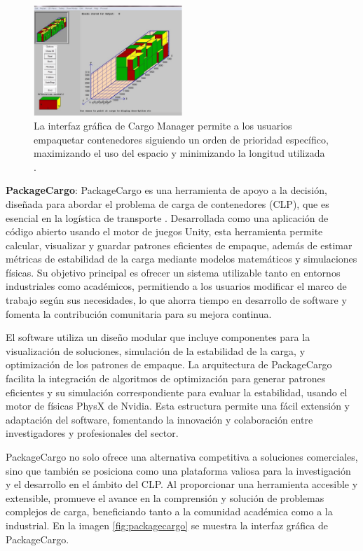 \documentclass[openany]{article}
\begin{document}
\begin{figure}[H]
    \centering
    \includegraphics[width=0.5\textwidth]{Figures/cargomanager.png}
    \caption{La interfaz gráfica de Cargo Manager permite a los usuarios empaquetar contenedores siguiendo un orden de prioridad específico, maximizando el uso del espacio y minimizando la longitud utilizada \parencite{zhao2017three}.}
    \label{fig:cargomanager}
\end{figure}

\textbf{PackageCargo}: PackageCargo es una herramienta de apoyo a la decisión, diseñada para abordar el problema de carga de contenedores (CLP), que es esencial en la logística de transporte \parencite{MARTINEZFRANCO2020100601}. Desarrollada como una aplicación de código abierto usando el motor de juegos Unity, esta herramienta permite calcular, visualizar y guardar patrones eficientes de empaque, además de estimar métricas de estabilidad de la carga mediante modelos matemáticos y simulaciones físicas. Su objetivo principal es ofrecer un sistema utilizable tanto en entornos industriales como académicos, permitiendo a los usuarios modificar el marco de trabajo según sus necesidades, lo que ahorra tiempo en desarrollo de software y fomenta la contribución comunitaria para su mejora continua.

El software utiliza un diseño modular que incluye componentes para la visualización de soluciones, simulación de la estabilidad de la carga, y optimización de los patrones de empaque. La arquitectura de PackageCargo facilita la integración de algoritmos de optimización para generar patrones eficientes y su simulación correspondiente para evaluar la estabilidad, usando el motor de físicas PhysX de Nvidia. Esta estructura permite una fácil extensión y adaptación del software, fomentando la innovación y colaboración entre investigadores y profesionales del sector.

PackageCargo no solo ofrece una alternativa competitiva a soluciones comerciales, sino que también se posiciona como una plataforma valiosa para la investigación y el desarrollo en el ámbito del CLP. Al proporcionar una herramienta accesible y extensible, promueve el avance en la comprensión y solución de problemas complejos de carga, beneficiando tanto a la comunidad académica como a la industrial. En la imagen \ref{fig:packagecargo} se muestra la interfaz gráfica de PackageCargo.
\end{document}
